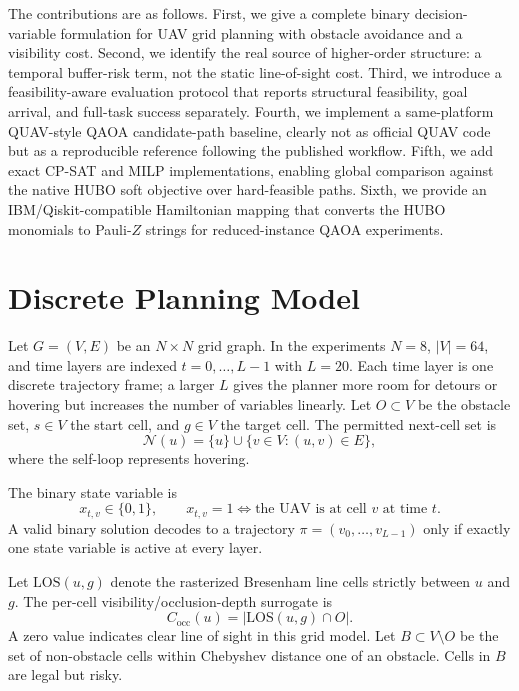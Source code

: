 \documentclass[10pt,conference]{IEEEtran}
\begin{document}
The contributions are as follows. First, we give a complete binary decision-variable formulation for UAV grid planning with obstacle avoidance and a visibility cost. Second, we identify the real source of higher-order structure: a temporal buffer-risk term, not the static line-of-sight cost. Third, we introduce a feasibility-aware evaluation protocol that reports structural feasibility, goal arrival, and full-task success separately. Fourth, we implement a same-platform QUAV-style QAOA candidate-path baseline, clearly not as official QUAV code but as a reproducible reference following the published workflow. Fifth, we add exact CP-SAT and MILP implementations, enabling global comparison against the native HUBO soft objective over hard-feasible paths. Sixth, we provide an IBM/Qiskit-compatible Hamiltonian mapping that converts the HUBO monomials to Pauli-$Z$ strings for reduced-instance QAOA experiments.

\section{Discrete Planning Model}
Let $G=(V,E)$ be an $N\times N$ grid graph. In the experiments $N=8$, $|V|=64$, and time layers are indexed $t=0,\ldots,L-1$ with $L=20$. Each time layer is one discrete trajectory frame; a larger $L$ gives the planner more room for detours or hovering but increases the number of variables linearly. Let $O\subset V$ be the obstacle set, $s\in V$ the start cell, and $g\in V$ the target cell. The permitted next-cell set is
\begin{equation}
\mathcal{N}(u)=\{u\}\cup\{v\in V:(u,v)\in E\},
\end{equation}
where the self-loop represents hovering.

The binary state variable is
\begin{equation}
 x_{t,v}\in\{0,1\},\qquad x_{t,v}=1 \Leftrightarrow \text{the UAV is at cell }v\text{ at time }t.
\end{equation}
A valid binary solution decodes to a trajectory $\pi=(v_0,\ldots,v_{L-1})$ only if exactly one state variable is active at every layer.

Let $\mathrm{LOS}(u,g)$ denote the rasterized Bresenham line cells strictly between $u$ and $g$. The per-cell visibility/occlusion-depth surrogate is
\begin{equation}
 C_{\mathrm{occ}}(u)=|\mathrm{LOS}(u,g)\cap O|.
\end{equation}
A zero value indicates clear line of sight in this grid model. Let $B\subset V\setminus O$ be the set of non-obstacle cells within Chebyshev distance one of an obstacle. Cells in $B$ are legal but risky.
\end{document}
